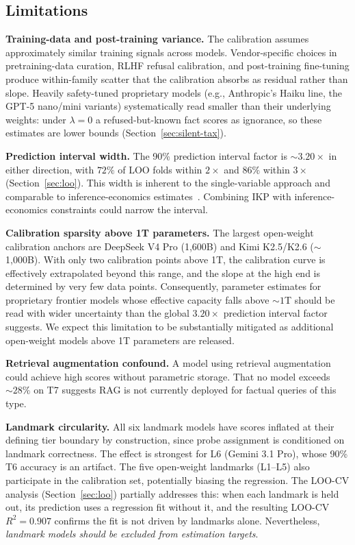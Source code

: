 \documentclass[11pt]{article}
\begin{document}
\subsection{Limitations}
\label{sec:limitations}

\textbf{Training-data and post-training variance.} The calibration assumes approximately similar training signals across models. Vendor-specific choices in pretraining-data curation, RLHF refusal calibration, and post-training fine-tuning produce within-family scatter that the calibration absorbs as residual rather than slope. Heavily safety-tuned proprietary models (e.g., Anthropic's Haiku line, the GPT-5 nano/mini variants) systematically read smaller than their underlying weights: under $\lambda=0$ a refused-but-known fact scores as ignorance, so these estimates are lower bounds (Section~\ref{sec:silent-tax}).

\textbf{Prediction interval width.} The 90\% prediction interval factor is ${\sim}3.20\times$ in either direction, with $72\%$ of LOO folds within $2\times$ and $86\%$ within $3\times$ (Section~\ref{sec:loo}). This width is inherent to the single-variable approach and comparable to inference-economics estimates~\citep{epochai2024}. Combining IKP with inference-economics constraints could narrow the interval.

\textbf{Calibration sparsity above 1T parameters.} The largest open-weight calibration anchors are DeepSeek V4 Pro (1{,}600B) and Kimi K2.5/K2.6 ($\sim$1{,}000B). With only two calibration points above 1T, the calibration curve is effectively extrapolated beyond this range, and the slope at the high end is determined by very few data points. Consequently, parameter estimates for proprietary frontier models whose effective capacity falls above ${\sim}1$T should be read with wider uncertainty than the global $3.20\times$ prediction interval factor suggests. We expect this limitation to be substantially mitigated as additional open-weight models above 1T parameters are released.

\textbf{Retrieval augmentation confound.} A model using retrieval augmentation~\citep{lewis2020retrieval} could achieve high scores without parametric storage. That no model exceeds ${\sim}28\%$ on T7 suggests RAG is not currently deployed for factual queries of this type.

\textbf{Landmark circularity.} All six landmark models have scores inflated at their defining tier boundary by construction, since probe assignment is conditioned on landmark correctness. The effect is strongest for L6 (Gemini 3.1 Pro), whose 90\% T6 accuracy is an artifact. The five open-weight landmarks (L1--L5) also participate in the calibration set, potentially biasing the regression. The LOO-CV analysis (Section~\ref{sec:loo}) partially addresses this: when each landmark is held out, its prediction uses a regression fit without it, and the resulting LOO-CV $R^2 = 0.907$ confirms the fit is not driven by landmarks alone. Nevertheless, \emph{landmark models should be excluded from estimation targets}.
\end{document}
